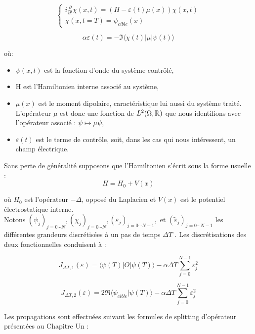 \begin{equation}
\begin{cases}
i \frac{\partial}{\partial t} \chi (x,t) = (H - \varepsilon(t)\mu(x))\chi(x,t)\\
\chi(x,t=T)=\psi_{cible}(x)
\end{cases}
\end{equation}

\begin{equation}
\alpha\varepsilon(t) = -\Im \langle \chi(t)|\mu|\psi(t)\rangle 
\end{equation}

où:
\begin{itemize}
	\item $\psi(x, t)$ est la fonction d'onde du système contrôlé,
	\item H est l'Hamiltonien interne associé au système,
	\item $\mu(x)$ est le moment dipolaire, caractéristique lui aussi du système traité. L'opérateur $\mu$ est donc une fonction de $L^2(\Omega, \mathbb R)$ que nous identifions avec l'opérateur associé : $\psi \mapsto \mu\psi$,
	\item $\varepsilon(t)$ est le terme de contrôle, soit, dans les cas qui nous intéressent, un champ
	électrique.
\end{itemize}

Sans perte de généralité supposons que l’Hamiltonien s'écrit sous la forme usuelle :
$$ H = H_0+V(x)$$

où $H_0$ est l'opérateur $-\Delta$, opposé du Laplacien et $V(x)$ est le potentiel électrostatique interne.\\

Notons $(\psi_j)_{j = 0\cdots N}, (\chi_j)_{j = 0\cdots N}, (\varepsilon_j)_{j = 0\cdots N-1}, $ et $(\tilde{\varepsilon}_j)_{j = 0\cdots N-1}$ les différentes grandeurs discrétisées à un pas de temps $\Delta T$ . Les discrétisations des deux fonctionnelles conduisent à :

\begin{equation}
J_{\Delta T,1}(\varepsilon) = \langle \psi(T)|O|\psi(T)\rangle - \alpha \Delta T \sum_{j=0}^{N -1} \varepsilon_j^2
\end{equation}

\begin{equation}
J_{\Delta T,2}(\varepsilon) = 2\Re \langle \psi_{cible}|\psi(T)\rangle - \alpha \Delta T \sum_{j=0}^{N -1} \varepsilon_j^2
\end{equation}

Les propagations sont effectuées suivant les formules de splitting d'opérateur présentées au Chapitre Un :

